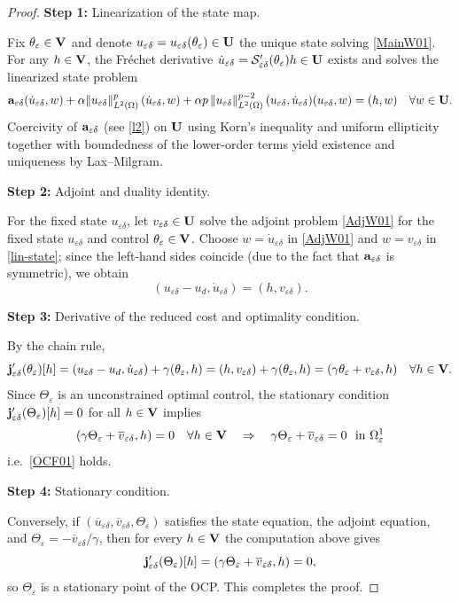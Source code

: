 \documentclass[11pt,a4paper]{article}
\numberwithin{equation}{section}
\def\wo{\overline}
\def\O{\Omega}
\def\e{\varepsilon}
\def\Ga{{\bf a}}
\def\Sc{{\mathcal{S}}}
\def\ed{{\varepsilon\delta}}
\def\Ga{{\bf a}}
\def\Gj{{\bf j}}
\def\GU{{\bf U}}
\def\GV{{\bf V}}
\begin{document}
		\begin{proof}			
			\textbf{Step 1:} Linearization of the state map.
			
			Fix $\theta_\e\in\GV$ and denote $u_\ed=u_\ed(\theta_\e)\in \GU$ the unique state solving \eqref{MainW01}. For any $h\in\GV$, the Fréchet derivative $\dot{u}_\ed=\Sc_\ed'(\theta_\e)h\in \GU$ exists and solves the
			linearized state problem
			\begin{equation}\label{lin-state}
				\Ga_\ed(\dot{u}_\ed,w)+\alpha\|u_\ed\|_{L^2(\O)}^{p}\,(\dot{u}_\ed,w)
				+\alpha p\,\|u_\ed\|_{L^2(\O)}^{p-2}\,(u_\ed,\dot{u}_\ed)(u_\ed,w)
				=(h,w)\quad\forall w\in \GU.
			\end{equation}
			Coercivity of $\Ga_\ed$ (see \eqref{l2}) on $\GU$ using Korn's inequality and uniform ellipticity together with  boundedness of the lower-order terms yield existence and uniqueness by Lax--Milgram.
			
			\textbf{Step 2:} Adjoint and duality identity.
			
			For the fixed state $u_\ed$, let $v_\ed\in \GU$ solve the adjoint problem \eqref{AdjW01} for the fixed state $u_\ed$ and control $\theta_\e\in\GV$.
			Choose $w=\dot{u}_\ed$ in \eqref{AdjW01} and  $w=v_\ed$ in \eqref{lin-state}; since the left-hand sides coincide (due to the fact that $\Ga_\ed$ is symmetric), we obtain
			\[
			(u_\ed-u_d,\dot{u}_\ed)=(h,v_\ed).
			\]
			
			\textbf{Step 3:} Derivative of the reduced cost and optimality condition.
			
			By the chain rule,
			\[
			\Gj_\ed'(\theta_\e)[h]=(u_\ed-u_d,\dot{u}_\ed)+\gamma(\theta_\e,h)
			=(h,v_\ed)+\gamma(\theta_\e,h)
			=(\gamma\theta_\e+v_\ed,h)\quad\forall h\in\GV.
			\]
			Since $\Theta_\e$ is an unconstrained optimal control, the stationary condition $\Gj_\ed'(\Theta_\e)[h]=0$ for all $h\in\GV$ implies
			\[
			(\gamma\Theta_\e+\wo v_\ed,h)=0\quad\forall h\in\GV
			\quad\Rightarrow\quad
			\gamma\Theta_\e+\wo v_\ed=0\ \text{ in $\Omega^1_\e$}
			\]
			i.e.~\eqref{OCF01} holds.
			
			{\bf Step 4:} Stationary condition.
			
			Conversely, if $(\wo u_\ed,\wo v_\ed,\Theta_\e)$ satisfies the state equation, the adjoint equation, and
			$\Theta_\e=-\wo v_\ed/\gamma$, then for every $h\in\GV$ the computation above gives
			\[
			\Gj_\ed'(\Theta_\e)[h]=(\gamma\Theta_\e+\wo v_\ed,h)=0,
			\]
			so $\Theta_\e$ is a stationary point of the OCP. This completes the proof.
		\end{proof}
\end{document}
